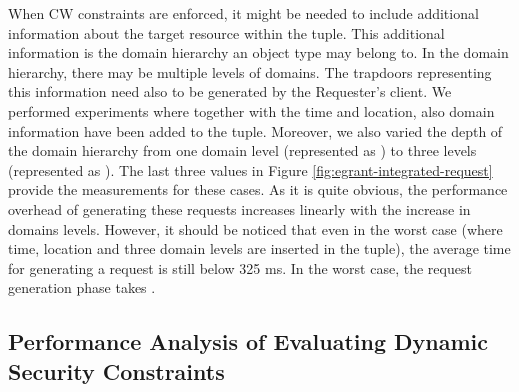 \documentclass[epsfig,a4paper,11pt,titlepage]{book}
\numberwithin{algorithm}{chapter}
\begin{document}
When \gls{CW} constraints are enforced, it might be needed to include additional information about the target resource within the  tuple. This additional information is the domain hierarchy an object type may belong to. In the domain hierarchy, there may be multiple levels of domains. The trapdoors representing this information need also to be generated by the Requester's client. We performed experiments where together with the time and location, also domain information have been added to the  tuple. Moreover, we also varied the depth of the domain hierarchy from one domain level (represented as ) to three levels (represented as ). The last three values in Figure \ref{fig:egrant-integrated-request} provide the measurements for these cases. As it is quite obvious, the performance overhead of generating these requests increases linearly with the increase in domains levels. However, it should be noticed that even in the worst case (where time, location and three domain levels are inserted in the  tuple), the average time for generating a request is still below 325 \gls{ms}. In the worst case, the request generation phase takes .

\subsection{Performance Analysis of Evaluating Dynamic Security Constraints}
\end{document}
